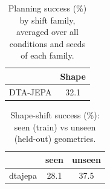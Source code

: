 \begin{table}[t]
\centering
\caption{Planning success (\%) by shift family, averaged over all conditions and seeds of each family.}
\label{tab:family}
\begin{tabular}{lc}
\toprule
 & Shape \\
\midrule
DTA-JEPA & 32.1 \\
\bottomrule
\end{tabular}
\end{table}

\begin{table}[t]
\centering
\caption{Shape-shift success (\%): seen (train) vs unseen (held-out) geometries.}
\label{tab:seenunseen}
\begin{tabular}{lcc}
\toprule
 & seen & unseen \\
\midrule
dtajepa & 28.1 & 37.5 \\
\bottomrule
\end{tabular}
\end{table}

